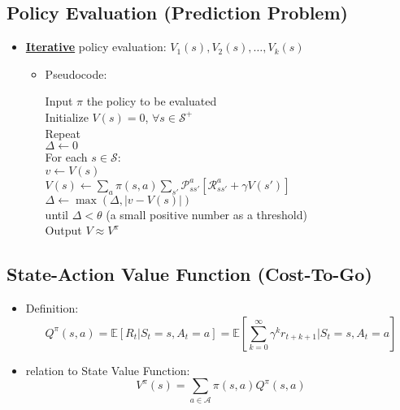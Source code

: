 \documentclass[twocolumn,landscape,10pt]{article}
\theoremstyle{definition}
\begin{document}
\subsection{Policy Evaluation (Prediction Problem)}

\begin{itemize}
    \item \textbf{\underline{Iterative}} policy evaluation:
        $V_1(s),V_2(s),\ldots,V_k(s)$
        \begin{itemize}
            \item Pseudocode:
                
                Input $\pi$ the policy to be evaluated\\
                Initialize $V(s)=0$, $\forall s\in\mathcal{S}^+$\\
                Repeat\\
                \hspace*{2ex} $\Delta \leftarrow 0$\\
                \hspace*{2ex} For each $s\in\mathcal{S}$: \\
                \hspace*{2ex}\hspace*{2ex} $v\leftarrow V(s)$\\
                \hspace*{2ex}\hspace*{2ex} $V(s)\leftarrow
                \sum_a\pi(s,a)\sum_{s'}\mathcal{P}_{ss'}^a[\mathcal{R}_{ss'}^a+\gamma
                V(s')]$\\
                \hspace*{2ex}\hspace*{2ex} $\Delta\leftarrow
                \max{(\Delta,|v-V(s)|)}$\\
                until $\Delta<\theta$ (a small positive number as a threshold)\\
                Output $V\approx V^\pi$
        \end{itemize}
\end{itemize}

\subsection{State-Action Value Function (Cost-To-Go)}

\begin{itemize}
    \item Definition:
        \[
            Q^\pi(s,a)=\mathbb{E}[R_t|S_t=s,A_t=a]
            =\mathbb{E}\left[\sum_{k=0}^{\infty}\gamma^k r_{t+k+1}|S_t=s,A_t=a\right]
        \]
    \item relation to State Value Function:
        \[
            V^\pi(s)=\sum_{a\in\mathcal{A}}\pi(s,a)Q^\pi(s,a)
        \]
\end{itemize}
\end{document}
